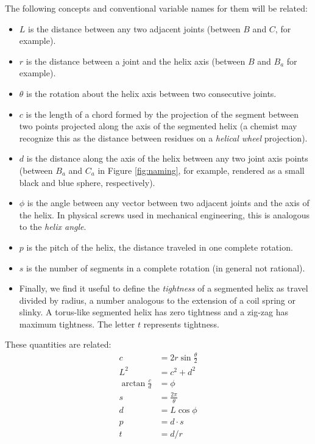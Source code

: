 \documentclass{svproc}
\begin{document}
The following concepts and conventional variable names for them will be related:
\begin{itemize}
\item $L$ is the distance between any two adjacent joints (between $B$ and $C$, for example).
  \item $r$ is the distance between a joint and the helix axis (between $B$ and $B_a$ for example).
  \item $\theta$ is the rotation about the helix axis between two consecutive joints.
  \item $c$ is the length of a chord formed by the projection of the segment between two points projected along the axis of the segmented helix (a chemist may recognize this as the distance between residues on a {\em helical wheel} projection).
  \item $d$ is the distance along the axis of the helix between any two joint axis points (between $B_a$ and $C_a$ in Figure \ref{fig:naming}, for example, rendered as a small black and blue
    sphere, respectively).
\item $\phi$ is the angle between any vector between two adjacent joints and the axis of the helix. In physical screws used in mechanical engineering, this is analogous to the {\em helix angle}.
  \item $p$ is the pitch of the helix, the distance traveled in one complete rotation.
  \item $s$ is the number of segments in a complete rotation (in general not rational).
\item  Finally, we find it useful to define the {\em tightness} of a segmented helix
as travel divided by radius, a number
analogous to the extension of a coil spring or slinky.
A torus-like segmented helix has zero tightness and a zig-zag has
maximum tightness. The letter $t$ represents tightness.

  \end{itemize}
These quantities are related:
\begin{align}
    c &= 2r\sin{\frac{\theta}{2}} \\
    L^2 &= c^2+d^2  \\
    \arctan{\frac{c}{d}}  &= \phi \\
    s &= \frac{2 \pi}{\theta} \\
    d &= L \cos{\phi} \\
    p &= d \cdot s \\
    t &= d / r
\end{align}
\end{document}
